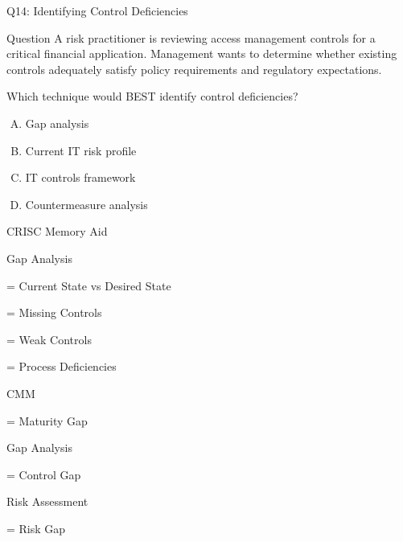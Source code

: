 \documentclass{beamer}
\begin{document}
	\begin{frame}{Q14: Identifying Control Deficiencies}
		\begin{block}{Question}
			A risk practitioner is reviewing access management controls for a
			critical financial application. Management wants to determine
			whether existing controls adequately satisfy policy requirements
			and regulatory expectations.
			
			Which technique would BEST identify control deficiencies?
		\end{block}
		
		\begin{enumerate}[(A)]
			\item Gap analysis
			\item Current IT risk profile
			\item IT controls framework
			\item Countermeasure analysis
		\end{enumerate}
		
			\begin{block}{CRISC Memory Aid}
			
			Gap Analysis
			
			= Current State vs Desired State
			
			= Missing Controls
			
			= Weak Controls
			
			= Process Deficiencies
			
			\vspace{0.15cm}
			
			CMM
			
			= Maturity Gap
			
			Gap Analysis
			
			= Control Gap
			
			Risk Assessment
			
			= Risk Gap
			
		\end{block}
	\end{frame}
	
\end{document}
